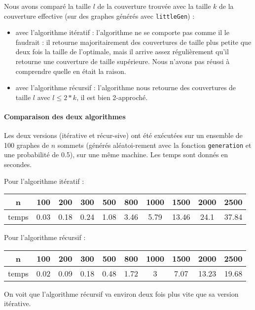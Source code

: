 \documentclass[a4paper,10pt]{article}
\begin{document}
Nous avons comparé la taille $l$ de la couverture trouvée avec la taille $k$ de la couverture effective (sur des graphes générés avec \texttt{littleGen}) :
\begin{itemize}
\item avec l'algorithme itératif : l'algorithme ne se comporte pas comme il le faudrait : il retourne majoritairement des couvertures de taille plus petite que deux fois la taille de l'optimale, mais il arrive assez régulièrement qu'il retourne une couverture de taille supérieure. Nous n'avons pas réussi à comprendre quelle en était la raison.
\item avec l'algorithme récursif : l'algorithme nous retourne des couvertures de taille $l$ avec $l \leq 2*k$, il est bien 2-approché.
\end{itemize}

\paragraph{Comparaison des deux algorithmes}

Les deux versions (itérative et récur-sive) ont été exécutées sur un ensemble de 100 graphes de $n$ sommets (générés aléatoi-rement avec la fonction \texttt{generation} et une probabilité de 0.5), sur une même machine.
Les temps sont donnés en secondes.

Pour l'algorithme itératif :
\begin{center}
\begin{tabular}{|c|c|c|c|c|c|c|c|c|c|}
	\hline 
	n & 100 & 200 & 300 & 500 & 800 & 1000 & 1500 & 2000 & 2500 \\
	\hline
	temps & 0.03 & 0.18 & 0.24 & 1.08 & 3.46 & 5.79 & 13.46 & 24.1 & 37.84 \\
	\hline
\end{tabular}
\end{center}

Pour l'algorithme récursif :
\begin{center}
\begin{tabular}{|c|c|c|c|c|c|c|c|c|c|}
	\hline 
	n & 100 & 200 & 300 & 500 & 800 & 1000 & 1500 & 2000 & 2500 \\
	\hline
	temps & 0.02 & 0.09 & 0.18 & 0.48 & 1.72 & 3 & 7.07 & 13.23 & 19.68\\
	\hline
\end{tabular}
\end{center}

On voit que l'algorithme récursif va environ deux fois plus vite que sa version itérative.
\end{document}
